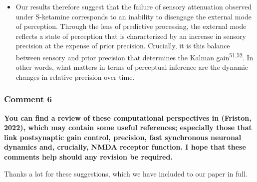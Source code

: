 \documentclass[
]{article}
\providecommand{\tightlist}{%
  \setlength{\itemsep}{0pt}\setlength{\parskip}{0pt}}
\begin{document}
\begin{itemize}
\tightlist
\item
  Our results therefore suggest that the failure of sensory attenuation
  observed under S-ketamine corresponds to an inability to disengage the
  external mode of perception. Through the lens of predictive
  processing, the external mode reflects a state of perception that is
  characterized by an increase in sensory precision at the expense of
  prior precision. Crucially, it is this balance between sensory and
  prior precision that determines the Kalman
  gain\textsuperscript{51,52}. In other words, what matters in terms of
  perceptual inference are the dynamic changes in relative precision
  over time.
\end{itemize}

\subsubsection{Comment 6}\label{comment-6}

\textbf{You can find a review of these computational perspectives in
(Friston, 2022), which may contain some useful references; especially
those that link postsynaptic gain control, precision, fast synchronous
neuronal dynamics and, crucially, NMDA receptor function. I hope that
these comments help should any revision be required.}

Thanks a lot for these suggestions, which we have included to our paper
in full.
\end{document}
